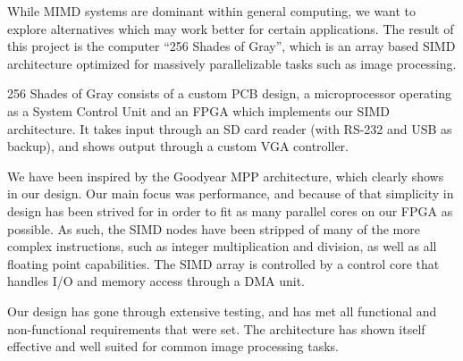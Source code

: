 While MIMD systems are dominant within general computing, we want to explore
alternatives which may work better for certain applications. The result of this
project is the computer ``256 Shades of Gray'', which is
an array based SIMD architecture optimized for massively parallelizable tasks
such as image processing.

256 Shades of Gray consists of a custom PCB design, a microprocessor operating
as a System Control Unit and an FPGA which implements our SIMD architecture. It
takes input through an SD card reader (with RS-232 and USB as
backup), and shows output
through a custom VGA controller.



We have been inspired by the Goodyear MPP architecture, which clearly shows in
our design. Our main focus was performance, and because of that simplicity in
design has been strived for in order to fit as many parallel cores on our FPGA
as possible. As such, the SIMD nodes have been stripped of many of the more
complex instructions, such as integer multiplication and division, as well as
all floating point capabilities. The SIMD array is controlled by a control core
that handles I/O and memory access through a DMA unit.

Our design has gone through extensive testing, and has met all functional and
non-functional requirements that were set. The architecture has shown itself
effective and well suited for common image processing tasks.
\endgroup
